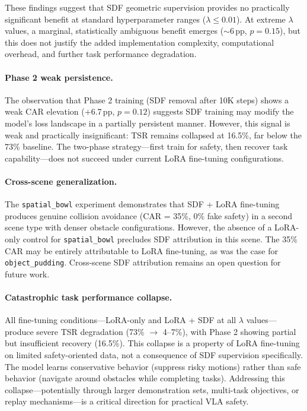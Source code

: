 \documentclass[letterpaper]{article}
\begin{document}
These findings suggest that SDF geometric supervision provides no practically significant benefit at standard hyperparameter ranges ($\lambda \leq 0.01$). At extreme $\lambda$ values, a marginal, statistically ambiguous benefit emerges (${\sim}$6\,pp, $p = 0.15$), but this does not justify the added implementation complexity, computational overhead, and further task performance degradation.

\paragraph{Phase 2 weak persistence.}
The observation that Phase 2 training (SDF removal after 10K steps) shows a weak CAR elevation ($+$6.7\,pp, $p = 0.12$) suggests SDF training may modify the model's loss landscape in a partially persistent manner. However, this signal is weak and practically insignificant: TSR remains collapsed at 16.5\%, far below the 73\% baseline. The two-phase strategy---first train for safety, then recover task capability---does not succeed under current LoRA fine-tuning configurations.

\paragraph{Cross-scene generalization.}
The \texttt{spatial\_bowl} experiment demonstrates that SDF + LoRA fine-tuning produces genuine collision avoidance (CAR = 35\%, 0\% fake safety) in a second scene type with denser obstacle configurations. However, the absence of a LoRA-only control for \texttt{spatial\_bowl} precludes SDF attribution in this scene. The 35\% CAR may be entirely attributable to LoRA fine-tuning, as was the case for \texttt{object\_pudding}. Cross-scene SDF attribution remains an open question for future work.

\paragraph{Catastrophic task performance collapse.}
All fine-tuning conditions---LoRA-only and LoRA + SDF at all $\lambda$ values---produce severe TSR degradation (73\% $\to$ 4--7\%), with Phase 2 showing partial but insufficient recovery (16.5\%). This collapse is a property of LoRA fine-tuning on limited safety-oriented data, not a consequence of SDF supervision specifically. The model learns conservative behavior (suppress risky motions) rather than safe behavior (navigate around obstacles while completing tasks). Addressing this collapse---potentially through larger demonstration sets, multi-task objectives, or replay mechanisms---is a critical direction for practical VLA safety.
\end{document}
